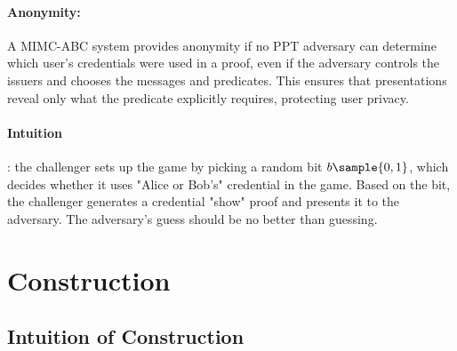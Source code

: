 \paragraph{Anonymity: }A MIMC-ABC system provides anonymity if no PPT adversary can determine which user’s credentials were used in a proof, even if the adversary controls the issuers and chooses the messages and predicates. This ensures that presentations reveal only what the predicate explicitly requires, protecting user privacy.

\paragraph{Intuition}: the challenger sets up the game by picking a random bit $b \sample \bit$, which decides whether it uses "Alice or Bob's" credential in the game. Based on the bit, the challenger generates a credential "show" proof and presents it to the adversary. The adversary's guess should be no better than guessing.


























\newpage
\section{Construction}

\subsection{Intuition of Construction}

